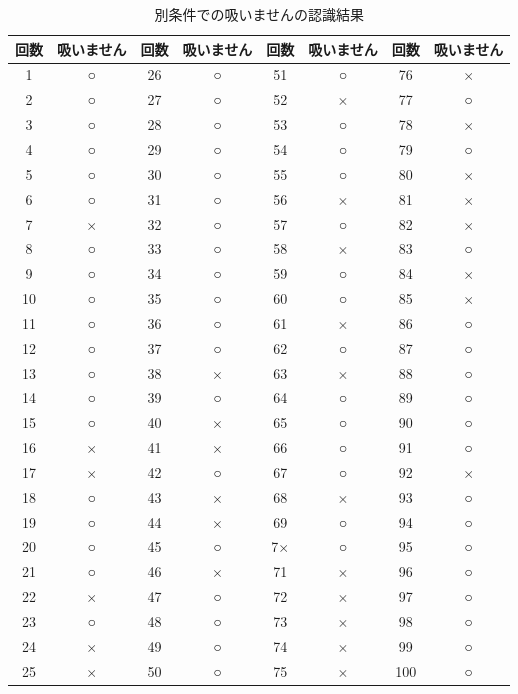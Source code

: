 \documentclass[12pt,oneside]{sotsuken_paper}
\begin{document}
\begin{table}[htb]
\begin{center}
\caption{別条件での吸いませんの認識結果}
\begin{tabular}{|c|c|c|c|c|c|c|c|}\hline
回数&吸いません&回数&吸いません&回数&吸いません&回数&吸いません\\\hline
1&○&26&○&51&○&76&$\times$\\\hline
2&○&27&○&52&$\times$&77&○\\\hline
3&○&28&○&53&○&78&$\times$\\\hline
4&○&29&○&54&○&79&○\\\hline
5&○&30&○&55&○&80&$\times$\\\hline
6&○&31&○&56&$\times$&81&$\times$\\\hline
7&$\times$&32&○&57&○&82&$\times$\\\hline
8&○&33&○&58&$\times$&83&○\\\hline
9&○&34&○&59&○&84&$\times$\\\hline
10&○&35&○&60&○&85&$\times$\\\hline
11&○&36&○&61&$\times$&86&○\\\hline
12&○&37&○&62&○&87&○\\\hline
13&○&38&$\times$&63&$\times$&88&○\\\hline
14&○&39&○&64&○&89&○\\\hline
15&○&40&$\times$&65&○&90&○\\\hline
16&$\times$&41&$\times$&66&○&91&○\\\hline
17&$\times$&42&○&67&○&92&$\times$\\\hline
18&○&43&$\times$&68&$\times$&93&○\\\hline
19&○&44&$\times$&69&○&94&○\\\hline
20&○&45&○&7$\times$&○&95&○\\\hline
21&○&46&$\times$&71&$\times$&96&○\\\hline
22&$\times$&47&○&72&$\times$&97&○\\\hline
23&○&48&○&73&$\times$&98&○\\\hline
24&$\times$&49&○&74&$\times$&99&○\\\hline
25&$\times$&50&○&75&$\times$&100&○
\\\hline
\end{tabular}
\label{tab:another-nonsmokrecogresult}
\end{center}
\end{table}
\end{document}
